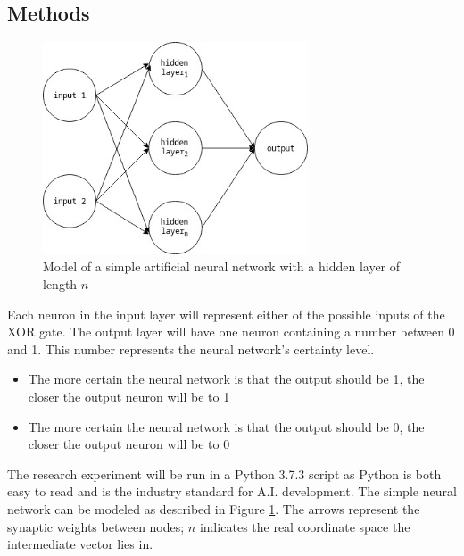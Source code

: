 \documentclass[12pt]{article}
\begin{document}
\subsection{Methods \label{methods}}

\begin{figure}
  \begin{center}
  \includegraphics[width=0.7\textwidth]{ANN-diagram.jpg}
  \caption{Model of a simple artificial neural network with a hidden layer of length \(n\)\label{anndiagram}}
  \end{center}
\end{figure}

Each neuron in the input layer will represent either of the possible inputs of the XOR gate. The output layer will have one neuron containing a number between 0 and 1. This number represents the neural network's certainty level.

\begin{itemize}
  \item The more certain the neural network is that the output should be 1, the closer the output neuron will be to 1
  \item The more certain the neural network is that the output should be 0, the closer the output neuron will be to 0
\end{itemize}

The research experiment will be run in a Python 3.7.3 script as Python is both easy to read and is the industry standard for A.I. development. The simple neural network can be modeled as described in Figure \ref{anndiagram}. The arrows represent the synaptic weights between nodes; \begin{math}n\end{math} indicates the real coordinate space the intermediate vector lies in.
\end{document}
